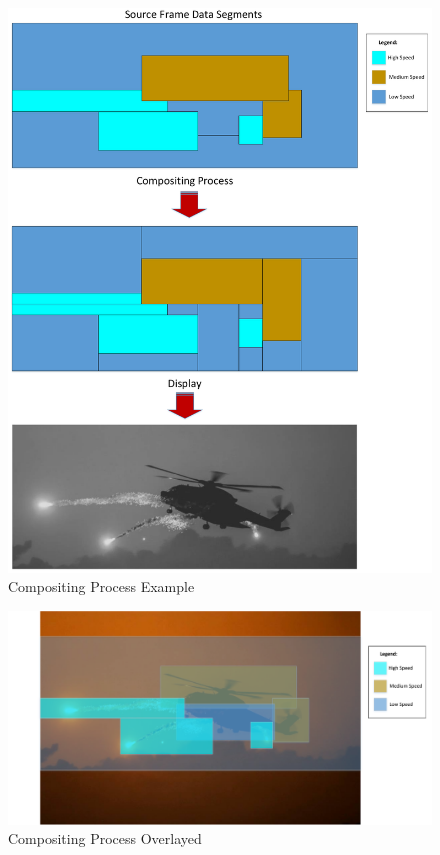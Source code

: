 \begin{figure}
        \centering
        \includegraphics[width=1.0\textwidth]{fig/compositing.pdf}
        \caption{Compositing Process Example}
        \label{fig:compositing}
\end{figure}

\begin{figure}
        \centering
        \includegraphics[width=1.0\textwidth]{fig/compositing_combined.pdf}
        \caption{Compositing Process Overlayed}
        \label{fig:compositing_overlayed}
\end{figure}


